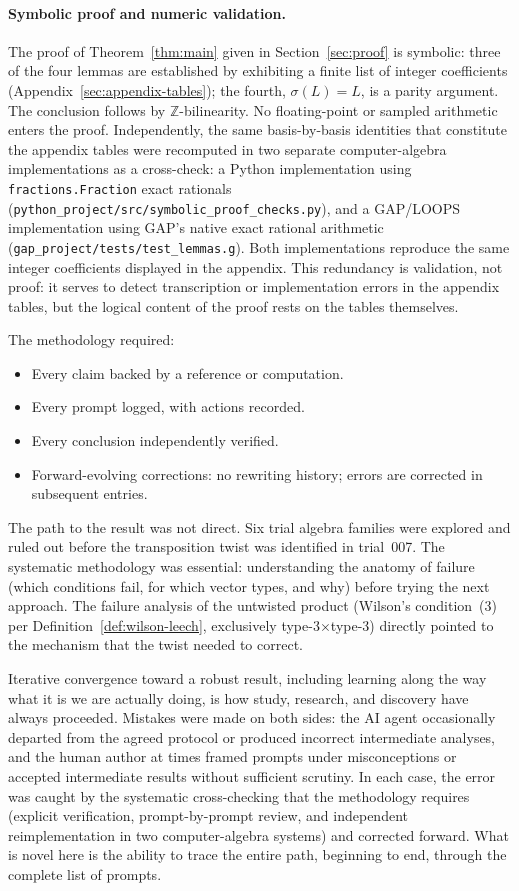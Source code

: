 \documentclass[twoside,english]{paper}
\numberwithin{equation}{section}
\numberwithin{figure}{section}
\theoremstyle{definition}
\theoremstyle{remark}
\newcommand{\ZZ}{\mathbb{Z}}
\begin{document}
\paragraph{Symbolic proof and numeric validation.}
The proof of Theorem~\ref{thm:main} given in Section~\ref{sec:proof}
is symbolic: three of the four lemmas are established by exhibiting a
finite list of integer coefficients
(Appendix~\ref{sec:appendix-tables}); the fourth, $\sigma(L) = L$,
is a parity argument.  The conclusion follows by $\ZZ$-bilinearity.  No floating-point
or sampled arithmetic enters the proof.  Independently, the same
basis-by-basis identities that constitute the appendix tables were
recomputed in two separate computer-algebra implementations as a
cross-check: a Python implementation using
\texttt{fractions.Fraction} exact rationals
(\texttt{python\_project/src/symbolic\_proof\_checks.py}), and a
GAP/LOOPS implementation using GAP's native exact rational arithmetic
(\texttt{gap\_project/tests/test\_lemmas.g}).  Both implementations
reproduce the same integer coefficients displayed in the appendix.
This redundancy is validation, not proof: it serves to detect
transcription or implementation errors in the appendix tables, but
the logical content of the proof rests on the tables themselves.

The methodology required:
\begin{itemize}
\item Every claim backed by a reference or computation.
\item Every prompt logged, with actions recorded.
\item Every conclusion independently verified.
\item Forward-evolving corrections: no rewriting history; errors are
  corrected in subsequent entries.
\end{itemize}

The path to the result was not direct.  Six trial algebra families
were explored and ruled out before the transposition twist was
identified in trial~007.  The systematic methodology was essential:
understanding the anatomy of failure (which conditions fail, for
which vector types, and why) before trying the next approach.  The failure analysis of the untwisted product (Wilson's
condition~(3) per Definition~\ref{def:wilson-leech}, exclusively
type-3$\times$type-3) directly pointed to the
mechanism that the twist needed to correct.

Iterative convergence toward a robust result, including learning
along the way what it is we are actually doing, is how study,
research, and discovery have always proceeded.  Mistakes were made
on both sides: the AI agent occasionally departed from the agreed
protocol or produced incorrect intermediate analyses, and the human
author at times framed prompts under misconceptions or accepted
intermediate results without sufficient scrutiny.  In each case, the
error was caught by the systematic cross-checking that the
methodology requires (explicit verification, prompt-by-prompt
review, and independent reimplementation in two computer-algebra
systems) and corrected forward.  What is novel here is the
ability to trace the entire path, beginning to end, through the
complete list of prompts.
\end{document}
